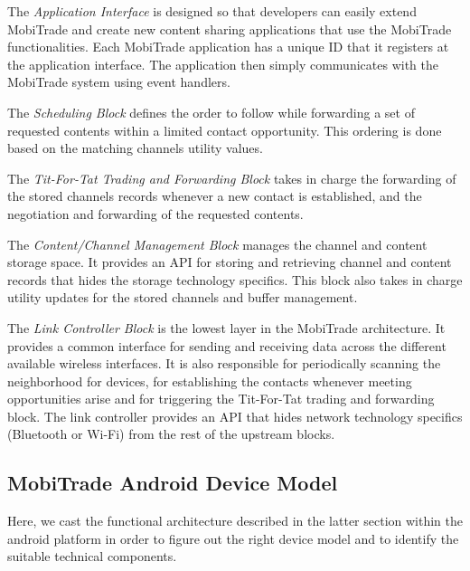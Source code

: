 The \textit{Application Interface} is designed so that developers can easily extend MobiTrade and create new content sharing applications that use the MobiTrade functionalities. Each MobiTrade application has a unique ID that it registers at the application interface. The application then simply communicates with the MobiTrade system using event handlers.

The \textit{Scheduling Block} defines the order to follow while forwarding a set of requested contents within a limited contact opportunity. This ordering is done based on the matching channels utility values.

The \textit{Tit-For-Tat Trading and Forwarding Block} takes in charge the forwarding of the stored channels records whenever a new contact is established, and the negotiation and forwarding of the requested contents.

The \textit{Content/Channel Management Block} manages the channel and content storage space. It provides an API for storing and retrieving channel and content records that hides the storage technology specifics. This block also takes in charge utility updates for the stored channels and buffer management.

The \textit{Link Controller Block} is the lowest layer in the MobiTrade architecture. It provides a common interface for sending and receiving data across the different available wireless interfaces. It is also responsible for periodically scanning the neighborhood for devices, for establishing the contacts whenever meeting opportunities arise and for triggering the Tit-For-Tat trading and forwarding block. The link controller provides an API that hides network technology specifics (Bluetooth or Wi-Fi) from the rest of the upstream blocks.

\subsection{MobiTrade Android Device Model}
\label{MobiTrade-device-model}
 
Here, we cast the functional architecture described in the latter section within the android platform in order to figure out the right device model and to identify the suitable technical components. 

